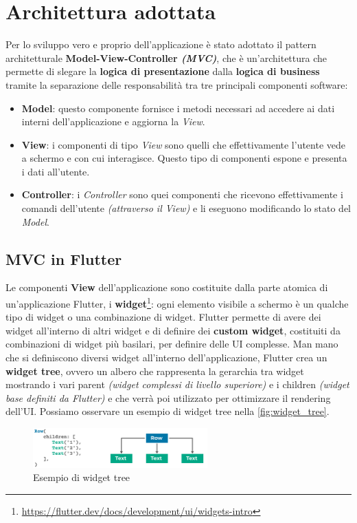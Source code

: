 \newpage \newpage

\section{Architettura adottata}
Per lo sviluppo vero e proprio dell'applicazione è stato adottato il pattern architetturale \textbf{Model-View-Controller \textit{(MVC)}}\cite{MVC}, che è un'architettura che permette di slegare la \textbf{logica di presentazione} dalla \textbf{logica di business} tramite la separazione delle responsabilità tra tre principali componenti software:
\begin{itemize}
\item \textbf{Model}: questo componente fornisce i metodi necessari ad accedere ai dati interni dell'applicazione e aggiorna la \textit{View}.
\item \textbf{View}: i componenti di tipo \textit{View} sono quelli che effettivamente l'utente vede a schermo e con cui interagisce. Questo tipo di componenti espone e presenta i dati all'utente.
\item \textbf{Controller}: i \textit{Controller} sono quei componenti che ricevono effettivamente i comandi dell'utente \textit{(attraverso il View)} e li eseguono modificando lo stato del \textit{Model}.
\end{itemize}

\subsection{MVC in Flutter}
\label{subsection:mvc}
Le componenti \textbf{View} dell'applicazione sono costituite dalla parte atomica di un'applicazione Flutter, i \textbf{widget}\footnote{\url{https://flutter.dev/docs/development/ui/widgets-intro}}: ogni elemento visibile a schermo è un qualche tipo di widget o una combinazione di widget. Flutter permette di avere dei widget all'interno di altri widget e di definire dei \textbf{custom widget}, costituiti da combinazioni di widget più basilari, per definire delle UI complesse. Man mano che si definiscono diversi widget all'interno dell'applicazione, Flutter crea un \textbf{widget tree}, ovvero un albero che rappresenta la gerarchia tra widget mostrando i vari parent \textit{(widget complessi di livello superiore)} e i children \textit{(widget base definiti da Flutter)} e che verrà poi utilizzato per ottimizzare il rendering dell'UI.
Possiamo osservare un esempio di widget tree nella \autoref{fig:widget_tree}.

\begin{figure}[h]
\centering
\includegraphics[width=0.6\textwidth]{img/widget_tree}
\caption{Esempio di widget tree}
\label{fig:widget_tree}
\end{figure}

